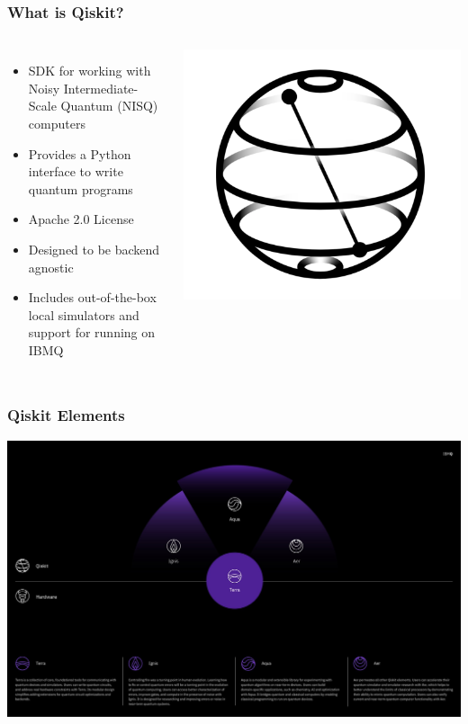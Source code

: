 \documentclass[aspectratio=169,11pt,hyperref={colorlinks=true}]{beamer}
\begin{document}
\begin{frame}
    \frametitle{What is Qiskit?}
    \begin{columns}
            \begin{itemize}
                \item SDK for working with Noisy Intermediate-Scale Quantum (NISQ) computers
                \item Provides a Python interface to write quantum programs
                \item Apache 2.0 License
                \item Designed to be backend agnostic
                \item Includes out-of-the-box local simulators and support for running on IBMQ
            \end{itemize}
            \includegraphics[width=\textwidth]{qiskit_logo.png}
    \end{columns}
\end{frame}

\begin{frame}
    \frametitle{Qiskit Elements}
    \centering
    \includegraphics[width=.9\textwidth]{qiskit-components.jpeg}
\end{frame}
\end{document}
